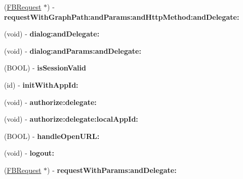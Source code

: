 \begin{DoxyCompactItemize}
\item 
\hypertarget{interface_facebook_a735024bca08b871be8fb5a7660ed56b5}{
(\hyperlink{interface_f_b_request}{\-F\-B\-Request} $\ast$) -\/ {\bfseries request\-With\-Graph\-Path\-:and\-Params\-:and\-Http\-Method\-:and\-Delegate\-:}}
\label{interface_facebook_a735024bca08b871be8fb5a7660ed56b5}

\item 
\hypertarget{interface_facebook_afb28ba8c9088bea131e780cbf7a34839}{
(void) -\/ {\bfseries dialog\-:and\-Delegate\-:}}
\label{interface_facebook_afb28ba8c9088bea131e780cbf7a34839}

\item 
\hypertarget{interface_facebook_a1912857d2083d698ee82dfe17346e6a4}{
(void) -\/ {\bfseries dialog\-:and\-Params\-:and\-Delegate\-:}}
\label{interface_facebook_a1912857d2083d698ee82dfe17346e6a4}

\item 
\hypertarget{interface_facebook_a6178476bc78da9727d4f2b32b9663a9a}{
(\-B\-O\-O\-L) -\/ {\bfseries is\-Session\-Valid}}
\label{interface_facebook_a6178476bc78da9727d4f2b32b9663a9a}

\item 
\hypertarget{interface_facebook_aa85460ff62b6bf81946548b7983b931d}{
(id) -\/ {\bfseries init\-With\-App\-Id\-:}}
\label{interface_facebook_aa85460ff62b6bf81946548b7983b931d}

\item 
\hypertarget{interface_facebook_ae8e4829a8dbf6270c1fa9ee66726560c}{
(void) -\/ {\bfseries authorize\-:delegate\-:}}
\label{interface_facebook_ae8e4829a8dbf6270c1fa9ee66726560c}

\item 
\hypertarget{interface_facebook_a6f8b7a7d0999024180dcdee71dba1dfe}{
(void) -\/ {\bfseries authorize\-:delegate\-:local\-App\-Id\-:}}
\label{interface_facebook_a6f8b7a7d0999024180dcdee71dba1dfe}

\item 
\hypertarget{interface_facebook_af59e46399f97cdb3f7f235822a30f06f}{
(\-B\-O\-O\-L) -\/ {\bfseries handle\-Open\-U\-R\-L\-:}}
\label{interface_facebook_af59e46399f97cdb3f7f235822a30f06f}

\item 
\hypertarget{interface_facebook_a204f10894608b3e10943e15d9861c9be}{
(void) -\/ {\bfseries logout\-:}}
\label{interface_facebook_a204f10894608b3e10943e15d9861c9be}

\item 
\hypertarget{interface_facebook_abda41d7c75de5231b460869564a4148c}{
(\hyperlink{interface_f_b_request}{\-F\-B\-Request} $\ast$) -\/ {\bfseries request\-With\-Params\-:and\-Delegate\-:}}
\label{interface_facebook_abda41d7c75de5231b460869564a4148c}


\end{DoxyCompactItemize}
